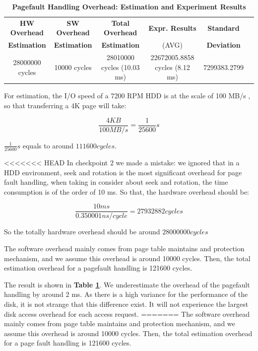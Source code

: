 \begin{table}[ht]
  \centering
  \caption{\textbf{Pagefault Handling Overhead: Estimation and Experiment Results}}
  \begin{threeparttable}
  \begin{tabular}{cccccc}
  \hline
        \textbf{HW Overhead} & \textbf{SW Overhead } & \textbf{Total Overhead} & \textbf{Expr. Results} & \textbf{Standard}\\
        \textbf{Estimation}       &  \textbf{Estimation}         & \textbf{Estimation}  & (AVG)   & \textbf{Deviation} \\
  \hline
        28000000 cycles & 10000 cycles & 28010000 cycles (10.03 ms)  & 22672005.8858 cycles (8.12 ms) & 7299383.2799 \\
  \hline
  \end{tabular}
  \end{threeparttable}
  \label{pagefault_handle_time}
\end{table}

For estimation, the I/O speed of a 7200 RPM HDD is at the scale of 100 MB/s \cite{wiki:hdd}, so that transferring a 4K page will take:

$$ \frac{4KB}{100 MB/s} = \frac{1}{25600} s $$

$\frac{1}{25600} s$ equals to around $111600 cycles$.

<<<<<<< HEAD
In checkpoint 2 we made a mistake: we ignored that in a HDD environment, seek and rotation is the most significant overhead for page fault handling, when taking in consider about seek and rotation, the time consumption is of the order of 10 ms. So that, the hardware overhead should be:

$$\frac{10 ms}{0.350001 ns/cycle} = 27932882 cycles$$

So the totally hardware overhead should be around $28000000 cycles$

The software overhead mainly comes from page table maintains and protection mechanism, and we assume this overhead is around 10000 cycles. Then, the total estimation overhead for a pagefault handling is 121600 cycles.

The result is shown in \textbf{Table \ref{pagefault_handle_time}}. We underestimate the overhead of the pagefault handling by around 2 ms. As there is a high variance for the performance of the disk, it is not strange that this difference exist. It will not experience the largest disk access overhead for each access request.
=======
The software overhead mainly comes from page table maintains and protection mechanism, and we assume this overhead is around 10000 cycles. Then, the total estimation overhead for a page fault handling is 121600 cycles.

